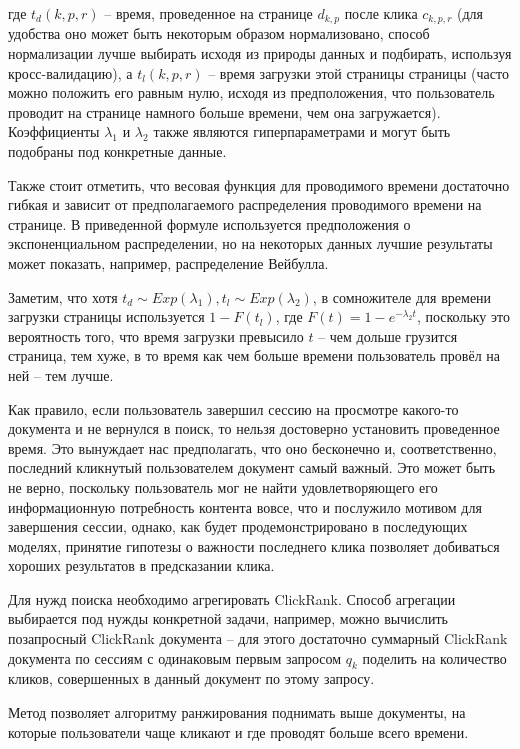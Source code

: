 \documentclass[diploma]{nanolab2015}
\begin{document}
где $t_d(k,p,r)$ -- время, проведенное на странице $d_{k,p}$ после клика $c_{k,p,r}$ (для удобства оно может быть некоторым образом нормализовано, способ нормализации лучше выбирать исходя из природы данных и подбирать, используя кросс-валидацию), а $t_l(k,p,r)$ -- время загрузки этой страницы страницы (часто можно положить его равным нулю, исходя из предположения, что пользователь проводит на странице намного больше времени, чем она загружается). Коэффициенты $\lambda_1$ и $\lambda_2$ также являются гиперпараметрами и могут быть подобраны под конкретные данные.

Также стоит отметить, что весовая функция для проводимого времени достаточно гибкая и зависит от предполагаемого распределения проводимого времени на странице. В приведенной формуле используется предположения о экспоненциальном распределении, но на некоторых данных лучшие результаты может показать, например, распределение Вейбулла.

Заметим, что хотя $t_d \sim Exp(\lambda_1), t_l \sim Exp(\lambda_2)$, в сомножителе для времени загрузки страницы используется $1-F(t_l)$, где $F(t) = 1 - e^{-\lambda_2 t}$, поскольку это вероятность того, что время загрузки превысило $t$ -- чем дольше грузится страница, тем хуже, в то время как чем больше времени пользователь провёл на ней -- тем лучше.

Как правило, если пользователь завершил сессию на просмотре какого-то документа и не вернулся в поиск, то нельзя достоверно установить проведенное время. Это вынуждает нас предполагать, что оно бесконечно и, соответственно, последний кликнутый пользователем документ самый важный. Это может быть не верно, поскольку пользователь мог не найти удовлетворяющего его информационную потребность контента вовсе, что и послужило мотивом для завершения сессии, однако, как будет продемонстрировано в последующих моделях, принятие гипотезы о важности последнего клика позволяет добиваться хороших результатов в предсказании клика.

Для нужд поиска необходимо агрегировать ClickRank. Способ агрегации выбирается под нужды конкретной задачи, например, можно вычислить позапросный ClickRank документа -- для этого достаточно суммарный ClickRank документа по сессиям с одинаковым первым запросом $q_k$ поделить на количество кликов, совершенных в данный документ по этому запросу.

Метод позволяет алгоритму ранжирования поднимать выше документы, на которые пользователи чаще кликают и где проводят больше всего времени.
\end{document}
